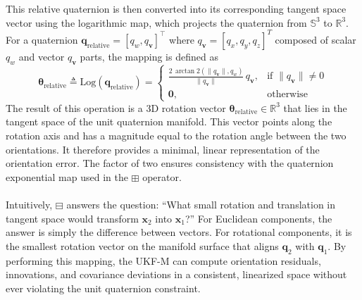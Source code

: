 \\ \\
This relative quaternion is then converted into its corresponding tangent space vector using the logarithmic map, which projects the quaternion from $\mathbb{S}^3$ to $\mathbb{R}^3$. For a quaternion $\mathbf{q}_{\text{relative}} = [q_w, q_{\mathbf{v}}]^\top$ where $q_{\mathbf{v}} = [q_x, q_y, q_z]^T$ composed of scalar $q_w$ and vector $q_{\mathbf{v}}$ parts, the mapping is defined as
$$
    \boldsymbol{\theta}_{\text{relative}} \triangleq
    \mathrm{Log}(\mathbf{q}_{\text{relative}}) =
    \begin{cases}
        \displaystyle \frac{2 \, \arctan2(\|q_{\mathbf{v}}\|, q_w)}{\|q_{\mathbf{v}}\|}\,q_{\mathbf{v}}, & \text{if } \|q_{\mathbf{v}}\| \neq 0 \\[1em]
        \mathbf{0}, & \text{otherwise}
    \end{cases}
$$
The result of this operation is a 3D rotation vector $\boldsymbol{\theta}_{\text{relative}} \in \mathbb{R}^3$ that lies in the tangent space of the unit quaternion manifold. This vector points along the rotation axis and has a magnitude equal to the rotation angle between the two orientations. It therefore provides a minimal, linear representation of the orientation error. The factor of two ensures consistency with the quaternion exponential map used in the $\boxplus$ operator.
\\ \\
Intuitively, $\boxminus$ answers the question: “What small rotation and translation in tangent space would transform $\mathbf{x}_2$ into $\mathbf{x}_1$?” For Euclidean components, the answer is simply the difference between vectors. For rotational components, it is the smallest rotation vector on the manifold surface that aligns $\mathbf{q}_2$ with $\mathbf{q}_1$. By performing this mapping, the UKF-M can compute orientation residuals, innovations, and covariance deviations in a consistent, linearized space without ever violating the unit quaternion constraint.

